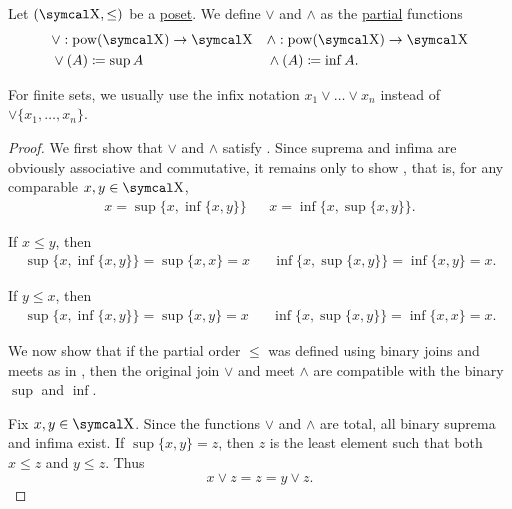 \begin{Definition}\label{def:lattice_operations}
  Let \( (\CX, \leq) \) be a \hyperref[def:poset]{poset}. We define  \( \vee \) and  \( \wedge \) as the \hyperref[def:function/partial]{partial} functions
  \begin{align*}
    &\vee: \Pow(\CX) \to \CX
    &&\wedge: \Pow(\CX) \to \CX
    \\
    &\vee(A) \coloneqq \sup A
    &&\wedge(A) \coloneqq \inf A.
  \end{align*}

  For finite sets, we usually use the infix notation \( x_1 \vee \ldots \vee x_n \) instead of \( \vee \{ x_1, \ldots, x_n \} \).
\end{Definition}
\begin{proof}
  We first show that \( \vee \) and \( \wedge \) satisfy . Since suprema and infima are obviously associative and commutative, it remains only to show , that is, for any comparable \( x, y \in \CX \),
  \begin{align*}
    x = \sup \{x, \inf \{ x, y \} \}
    &&
    x = \inf \{x, \sup \{ x, y \} \}.
  \end{align*}

  If \( x \leq y \), then
  \begin{align*}
    \sup \{ x, \inf \{ x, y \} \} = \sup \{ x, x \} = x
    &&
    \inf \{ x, \sup \{ x, y \} \} = \inf \{ x, y \} = x.
  \end{align*}

  If \( y \leq x \), then
  \begin{align*}
    \sup \{ x, \inf \{ x, y \} \} = \sup \{ x, y \} = x
    &&
    \inf \{ x, \sup \{ x, y \} \} = \inf \{ x, x \} = x.
  \end{align*}

  We now show that if the partial order \( \leq \) was defined using binary joins and meets as in , then the original join \( \vee \) and meet \( \wedge \) are compatible with the binary \( \sup \) and \( \inf \).

  Fix \( x, y \in \CX \). Since the functions \( \vee \) and \( \wedge \) are total, all binary suprema and infima exist. If \( \sup \{ x, y \} = z \), then \( z \) is the least element such that both \( x \leq z \) and \( y \leq z \). Thus
  \begin{equation*}
    x \vee z = z = y \vee z.
  \end{equation*}


\end{proof}
